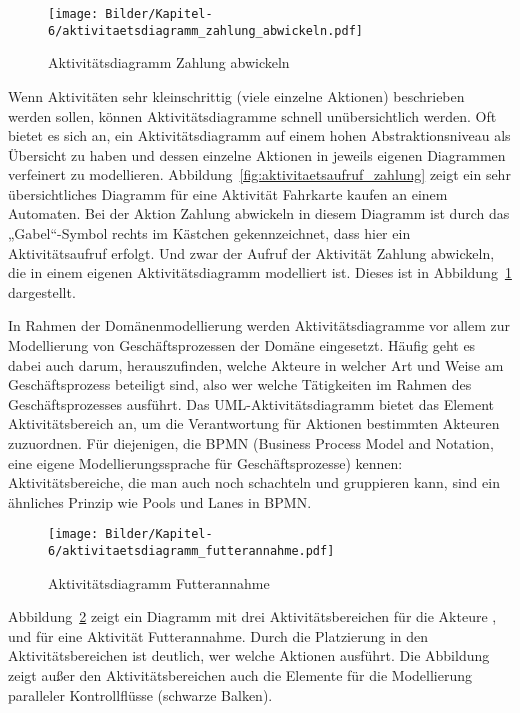 \begin{figure}[h!]
	\centering
	\texttt{[image: Bilder/Kapitel-6/aktivitaetsdiagramm\_zahlung\_abwickeln.pdf]}
	\caption{Aktivitätsdiagramm Zahlung abwickeln}
	\label{fig:aktivitaetsdiagramm_zahlung_abwickeln}
\end{figure}

Wenn Aktivitäten sehr kleinschrittig (viele einzelne Aktionen) beschrieben werden sollen, können Aktivitätsdiagramme schnell unübersichtlich werden. Oft bietet es sich an, ein Aktivitätsdiagramm auf einem hohen Abstraktionsniveau als Übersicht zu haben und dessen einzelne Aktionen in jeweils eigenen Diagrammen verfeinert zu modellieren. Abbildung~\ref{fig:aktivitaetsaufruf_zahlung} zeigt ein sehr übersichtliches Diagramm für eine Aktivität Fahrkarte kaufen an einem Automaten. Bei der Aktion Zahlung abwickeln in diesem Diagramm ist durch das „Gabel“-Symbol rechts im Kästchen gekennzeichnet, dass hier ein Aktivitätsaufruf erfolgt. Und zwar der Aufruf der Aktivität Zahlung abwickeln, die in einem eigenen Aktivitätsdiagramm modelliert ist. Dieses ist in Abbildung~\ref{fig:aktivitaetsdiagramm_zahlung_abwickeln} dargestellt. 



In Rahmen der Domänenmodellierung werden Aktivitätsdiagramme vor allem zur Modellierung von Geschäftsprozessen der Domäne eingesetzt. Häufig geht es dabei auch darum, herauszufinden, welche Akteure in welcher Art und Weise am Geschäftsprozess beteiligt sind, also wer welche Tätigkeiten im Rahmen des Geschäftsprozesses ausführt. Das UML-Aktivitätsdiagramm bietet das Element Aktivitätsbereich an, um die Verantwortung für Aktionen bestimmten Akteuren zuzuordnen. Für diejenigen, die BPMN (Business Process Model and Notation, eine eigene Modellierungssprache für Geschäftsprozesse) kennen: Aktivitätsbereiche, die man auch noch schachteln und gruppieren kann, sind ein ähnliches Prinzip wie Pools und Lanes in BPMN. 

\begin{figure}[h!]
	\centering
	\texttt{[image: Bilder/Kapitel-6/aktivitaetsdiagramm\_futterannahme.pdf]}
	\caption{Aktivitätsdiagramm Futterannahme}
	\label{fig:aktivitaetsdiagramm_futterannahme}
\end{figure}

Abbildung~\ref{fig:aktivitaetsdiagramm_futterannahme} zeigt ein Diagramm mit drei Aktivitätsbereichen für die Akteure \linebreak
{},  und  für eine Aktivität Futterannahme. Durch die Platzierung in den Aktivitätsbereichen ist deutlich, wer welche Aktionen ausführt. Die Abbildung zeigt außer den Aktivitätsbereichen auch die Elemente für die Modellierung paralleler Kontrollflüsse (schwarze Balken). 

